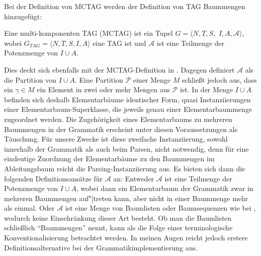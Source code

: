 Bei der Definition von MCTAG werden der Definition von TAG Baummengen hinzugefügt:
\begin{definition}[MCTAG]
Eine multi-komponenten TAG (MCTAG) ist ein Tupel \linebreak $G = \langle N,T,S,$ $I,A,\mathcal{A} \rangle$, wobei $G_{TAG} = \langle N,T,S,I,A\rangle$ eine TAG ist und $\mathcal{A}$ ist eine Teilmenge der Potenzmenge von $I \cup A$.
\end{definition}
Dies deckt sich ebenfalls mit der MCTAG-Definition in \cite{Kallmeyer:05}. Dagegen definiert \cite{Kallmeyer:09} $\mathcal{A}$ als die Partition von $I \cup A$. Eine Partition $\mathcal{P}$ einer Menge $M$ schlie\ss t jedoch aus, dass ein  $\gamma \in M$ ein Element in zwei oder mehr Mengen aus $\mathcal{P}$ ist. In der Menge $I \cup A$ befinden sich deshalb Elementarbäume identischer Form, quasi Instanziierungen einer Elementarbaum-Superklasse, die jeweils genau einer Elementarbaummenge zugeordnet werden. Die Zugehörigkeit eines Elementarbaums zu mehreren Baummengen in der Grammatik erscheint unter diesen Voraussetzungen als Täuschung. Für unsere Zwecke ist diese zweifache Instanziierung, sowohl innerhalb der Grammatik als auch beim Parsen, nicht notwendig, denn für eine eindeutige Zuordnung der Elementarbäume zu den Baummengen im Ableitungsbaum reicht die Parsing-Instanziierung aus. Es bieten sich dann die folgenden Definitionsansätze für $\mathcal{A}$ an: Entweder $\mathcal{A}$ ist eine Teilmenge der Potenzmenge von $I \cup A$, wobei dann ein Elementarbaum der Grammatik zwar in mehreren Baummengen auf"|treten kann, aber nicht in einer Baummenge mehr als einmal. Oder $\mathcal{A}$ ist eine Menge von Baumlisten oder Baumsequenzen wie bei \cite{Weir:88}, wodurch keine Einschränkung dieser Art besteht. Ob man die Baumlisten schlie\ss lich "`Baummengen"' nennt, kann als die Folge einer terminologische Konventionalisierung betrachtet werden. In meinen Augen reicht jedoch erstere Definitionsalternative bei der Grammatikimplementierung aus.

